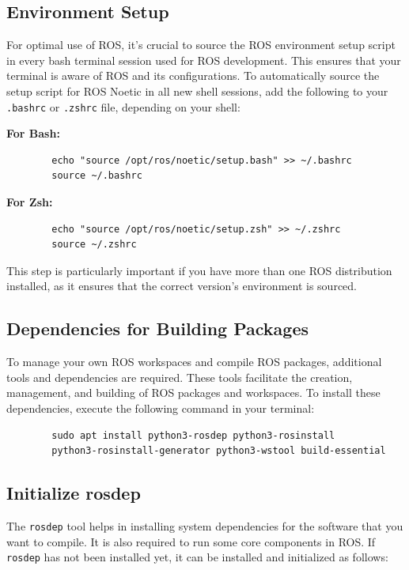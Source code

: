 \documentclass[12pt,a4paper]{article}
\begin{document}
	\subsection{Environment Setup}
	For optimal use of ROS, it's crucial to source the ROS environment setup script in every bash terminal session used for ROS development. This ensures that your terminal is aware of ROS and its configurations. To automatically source the setup script for ROS Noetic in all new shell sessions, add the following to your \texttt{.bashrc} or \texttt{.zshrc} file, depending on your shell:
	
	\textbf{For Bash:}
	\begin{verbatim}
		echo "source /opt/ros/noetic/setup.bash" >> ~/.bashrc
		source ~/.bashrc
	\end{verbatim}
	
	\textbf{For Zsh:}
	\begin{verbatim}
		echo "source /opt/ros/noetic/setup.zsh" >> ~/.zshrc
		source ~/.zshrc
	\end{verbatim}
	
	This step is particularly important if you have more than one ROS distribution installed, as it ensures that the correct version's environment is sourced.
	
	\subsection{Dependencies for Building Packages}
	To manage your own ROS workspaces and compile ROS packages, additional tools and dependencies are required. These tools facilitate the creation, management, and building of ROS packages and workspaces. To install these dependencies, execute the following command in your terminal:
	
	\begin{verbatim}
		sudo apt install python3-rosdep python3-rosinstall 
		python3-rosinstall-generator python3-wstool build-essential
	\end{verbatim}
	
	\subsection{Initialize rosdep}
	The \texttt{rosdep} tool helps in installing system dependencies for the software that you want to compile. It is also required to run some core components in ROS. If \texttt{rosdep} has not been installed yet, it can be installed and initialized as follows:
	
\end{document}
